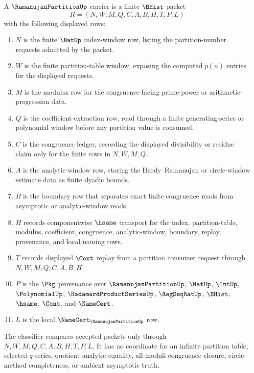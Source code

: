 \begin{definition}
\label{def:ramanujan-partition-carrier}
A $\RamanujanPartitionUp$ carrier is a finite $\BHist$ packet
$$
R=(N,W,M,Q,C,A,B,H,T,P,L)
$$
with the following displayed rows:
\begin{enumerate}
\item $N$ is the finite $\NatUp$ index-window row, listing the partition-number requests admitted by the packet.
\item $W$ is the finite partition-table window, exposing the computed $p(n)$ entries for the displayed requests.
\item $M$ is the modulus row for the congruence-facing prime-power or arithmetic-progression data.
\item $Q$ is the coefficient-extraction row, read through a finite generating-series or polynomial window before any partition value is consumed.
\item $C$ is the congruence ledger, recording the displayed divisibility or residue claim only for the finite rows in $N,W,M,Q$.
\item $A$ is the analytic-window row, storing the Hardy--Ramanujan or circle-window estimate data as finite dyadic bounds.
\item $B$ is the boundary row that separates exact finite congruence reads from asymptotic or analytic-window reads.
\item $H$ records componentwise $\hsame$ transport for the index, partition-table, modulus, coefficient, congruence, analytic-window, boundary, replay, provenance, and local naming rows.
\item $T$ records displayed $\Cont$ replay from a partition consumer request through $N,W,M,Q,C,A,B,H$.
\item $P$ is the $\Pkg$ provenance over $\RamanujanPartitionUp$, $\NatUp$, $\IntUp$, $\PolynomialUp$, $\HadamardProductSeriesUp$, $\RegSeqRatUp$, $\BHist$, $\hsame$, $\Cont$, and $\NameCert$.
\item $L$ is the local $\NameCert_{\RamanujanPartitionUp}$ row.
\end{enumerate}
The classifier compares accepted packets only through $N,W,M,Q,C,A,B,H,T,P,L$. It has no coordinate for an infinite partition table, selected $q$-series, quotient analytic equality, all-moduli congruence closure, circle-method completeness, or ambient asymptotic truth.
\end{definition}

